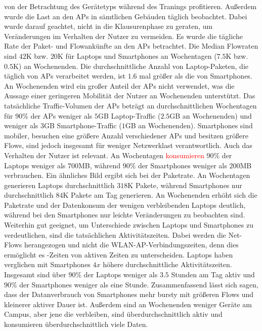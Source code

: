 \documentclass[12pt, a4paper]{article}
\begin{document}
von der Betrachtung des Gerätetyps während des Tranings profitieren.
\newline\newline
Außerdem wurde die Last an den APs in sämtlichen Gebäuden täglich beobachtet. Dabei wurde darauf geachtet,
nicht in die Klausurenphase zu geraten, um Veränderungen im Verhalten der Nutzer zu vermeiden.
Es wurde die tägliche Rate der Paket- und Flowankünfte an den APs betrachtet. Die Median Flowraten sind
$42$\textsc{K} bzw. $20$\textsc{K} für Laptops und Smartphones an Wochentagen ($7.5$\textsc{K} bzw. $0.5$\textsc{K})
an Wochenenden. Die durchschnittliche Anzahl von Laptop-Paketen, die täglich von APs verarbeitet werden,
ist $1.6$ mal größer als die von Smartphones. An Wochenenden wird ein großer Anteil der APs nicht verwendet,
was die Aussage einer geringeren Mobilität der Nutzer an Wochenenden unterstützt.
Das tatsächliche Traffic-Volumen der APs beträgt an durchschnittlichen Wochentagen für $90 \%$ der APs
weniger als $5$\textsc{GB} Laptop-Traffic ($2.5$\textsc{GB} an Wochenenden) und weniger als $3$\textsc{GB} Smartphone-Traffic
($1$\textsc{GB} an Wochenenden). Smartphones sind mobiler, besuchen eine größere Anzahl verschiedener APs
und besitzen größere Flows, sind jedoch insgesamt für weniger Netzwerklast verantwortlich.
\newline\newline
Auch das Verhalten der Nutzer ist relevant. An Wochentagen \textcolor{red}{konsumieren} $90 \%$ der Laptops weniger als $700$\textsc{MB},
während $90 \%$ der Smartphones weniger als $200$\textsc{MB} verbrauchen.
Ein ähnliches Bild ergibt sich bei der Paketrate. An Wochentagen generieren Laptops durchschnittlich $318$\textsc{K} Pakete, 
während Smartphones nur durchschnittlich $84$\textsc{K} Pakete am Tag generieren. 
An Wochenenden erhöht sich die Paketrate und der Datenkonsum der wenigen verbleibenden Laptops deutlich,
während bei den Smartphones nur leichte Veränderungen zu beobachten sind.\newline
Weiterhin gut geeignet, um Unterschiede zwischen Laptops und Smartphones zu verdeutlichen, sind die tatsächlichen Aktivitätszeiten.
Dabei werden die Net-Flows herangezogen und nicht die WLAN-AP-Verbindungszeiten, denn dies ermöglicht es -Zeiten
von aktiven Zeiten zu unterscheiden. Laptops haben verglichen mit Smartphones $4x$ höhere durchschnittliche Aktivitätszeiten.
Insgesamt sind über $90 \%$ der Laptops weniger als $3.5$ Stunden am Tag aktiv und $90 \%$ der Smartphones weniger als eine Stunde.\newline
Zusammenfassend lässt sich sagen, dass der Datanverbrauch von Smartphones mehr bursty mit größeren Flows und kleinerer aktiver Dauer ist.
Außerdem sind an Wochenenden weniger Geräte am Campus, aber jene die verbleiben, sind überdurchschnittlich aktiv 
und konsumieren überdurchschnittlich viele Daten.
\end{document}
